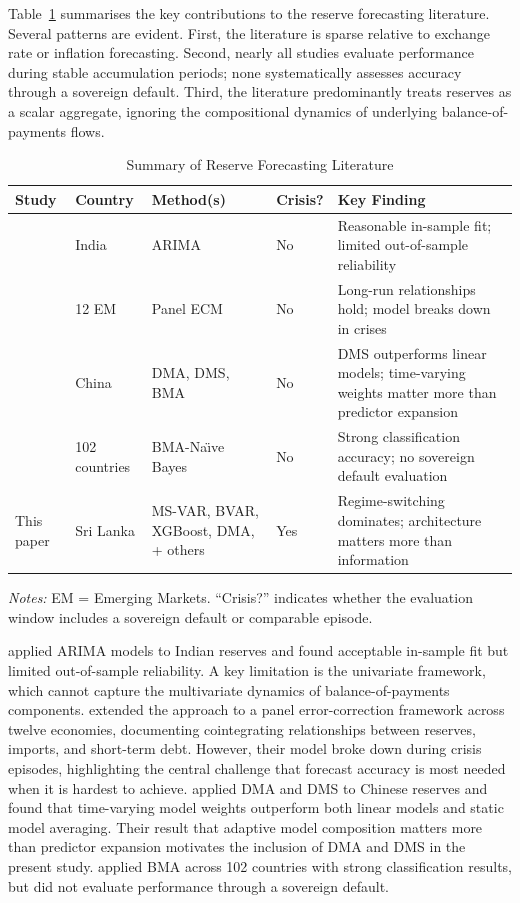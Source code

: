 \documentclass[12pt,a4paper]{article}
\begin{document}
Table~\ref{tab:lit_summary} summarises the key contributions to the reserve forecasting literature. Several patterns are evident. First, the literature is sparse relative to exchange rate or inflation forecasting. Second, nearly all studies evaluate performance during stable accumulation periods; none systematically assesses accuracy through a sovereign default. Third, the literature predominantly treats reserves as a scalar aggregate, ignoring the compositional dynamics of underlying balance-of-payments flows.

\begin{table}[htbp]
\centering
\caption{Summary of Reserve Forecasting Literature}
\label{tab:lit_summary}
\begin{tabular}{p{3.2cm}p{2.2cm}p{3cm}p{1.5cm}p{3.5cm}}
\toprule
Study & Country & Method(s) & Crisis? & Key Finding \\
\midrule
\cite{SehgalSharma2008} & India & ARIMA & No & Reasonable in-sample fit; limited out-of-sample reliability \\
\cite{Gosselin2005} & 12 EM & Panel ECM & No & Long-run relationships hold; model breaks down in crises \\
\cite{Gupta2014} & China & DMA, DMS, BMA & No & DMS outperforms linear models; time-varying weights matter more than predictor expansion \\
\cite{Salas2025} & 102 countries & BMA-Na\"{\i}ve Bayes & No & Strong classification accuracy; no sovereign default evaluation \\
This paper & Sri Lanka & MS-VAR, BVAR, XGBoost, DMA, + others & Yes & Regime-switching dominates; architecture matters more than information \\
\bottomrule
\end{tabular}
\begin{tablenotes}
\small
\item \textit{Notes:} EM = Emerging Markets. ``Crisis?'' indicates whether the evaluation window includes a sovereign default or comparable episode.
\end{tablenotes}
\end{table}

\cite{SehgalSharma2008} applied ARIMA models to Indian reserves and found acceptable in-sample fit but limited out-of-sample reliability. A key limitation is the univariate framework, which cannot capture the multivariate dynamics of balance-of-payments components. \cite{Gosselin2005} extended the approach to a panel error-correction framework across twelve economies, documenting cointegrating relationships between reserves, imports, and short-term debt. However, their model broke down during crisis episodes, highlighting the central challenge that forecast accuracy is most needed when it is hardest to achieve. \cite{Gupta2014} applied DMA and DMS to Chinese reserves and found that time-varying model weights outperform both linear models and static model averaging. Their result that adaptive model composition matters more than predictor expansion motivates the inclusion of DMA and DMS in the present study. \cite{Salas2025} applied BMA across 102 countries with strong classification results, but did not evaluate performance through a sovereign default.
\end{document}
